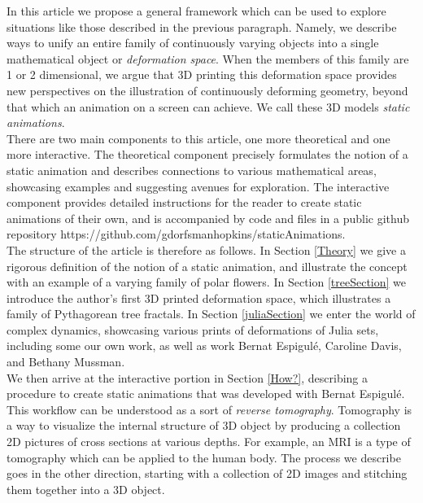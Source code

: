 \documentclass[12 pt]{article}
\begin{document}
In this article we propose a general framework which can be used to explore situations like those described in the previous paragraph.  Namely, we describe ways to unify an entire family of continuously varying objects into a single mathematical object or \textit{deformation space}.  When the members of this family are 1 or 2 dimensional, we argue that 3D printing this deformation space provides new perspectives on the illustration of continuously deforming geometry, beyond that which an animation on a screen can achieve.  We call these 3D models \textit{static animations}.\\

There are two main components to this article, one more theoretical and one more interactive.  The theoretical component precisely formulates the notion of a static animation and describes connections to various mathematical areas, showcasing examples and suggesting avenues for exploration.  The interactive component provides detailed instructions for the reader to create static animations of their own, and is accompanied by code and files in a public github repository https://github.com/gdorfsmanhopkins/staticAnimations.\\

The structure of the article is therefore as follows.  In Section \ref{Theory} we give a rigorous definition of the notion of a static animation, and illustrate the concept with an example of a varying family of polar flowers.  In Section \ref{treeSection} we introduce the author's first 3D printed deformation space, which illustrates a family of Pythagorean tree fractals.  In Section \ref{juliaSection} we enter the world of complex dynamics, showcasing various prints of deformations of Julia sets, including some our own work, as well as work Bernat Espigul\'e, Caroline Davis, and Bethany Mussman.\\

We then arrive at the interactive portion in Section \ref{How?}, describing a procedure to create static animations that was developed with Bernat Espigul\'e.  This workflow can be understood as a sort of \textit{reverse tomography}.  Tomography is a way to visualize the internal structure of 3D object by producing a collection 2D pictures of cross sections at various depths.  For example, an MRI is a type of tomography which can be applied to the human body.  The process we describe goes in the other direction, starting with a collection of 2D images and stitching them together into a 3D object.\\
\end{document}
